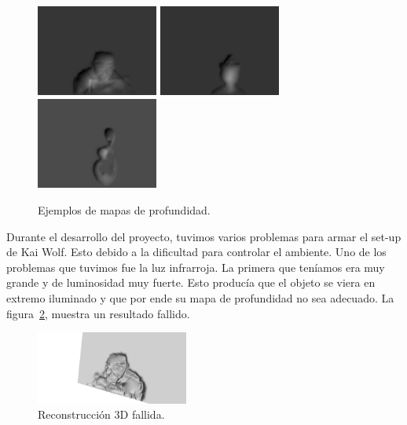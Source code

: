 \documentclass[twocolumn,11pts]{IEEEtran}
\begin{document}
\begin{figure}[t]
\begin{center}
	\includegraphics[width= 4cm]{Profundidadcrepu}
	\includegraphics[width= 4cm]{Profundidadmona}
	\includegraphics[width= 4cm]{Profundidadniple}
		\caption{Ejemplos de mapas de profundidad.}
		\label{profundidad}
\end{center}
\end{figure}

Durante el desarrollo del proyecto, tuvimos varios problemas para armar el set-up de Kai Wolf. Esto debido a la dificultad para controlar el ambiente. Uno de los problemas que tuvimos fue la luz infrarroja. La primera que teníamos era muy grande y de luminosidad muy fuerte. Esto producía que el objeto se viera en extremo iluminado y que por ende su mapa de profundidad no sea adecuado. La figura~\ref{crepu}, muestra un resultado fallido.

\begin{figure}[t]
\begin{center}
	\includegraphics[width= 5cm]{3dcrepu00}
		\caption{Reconstrucción 3D fallida.}
		\label{crepu}
\end{center}
\end{figure}
\end{document}

